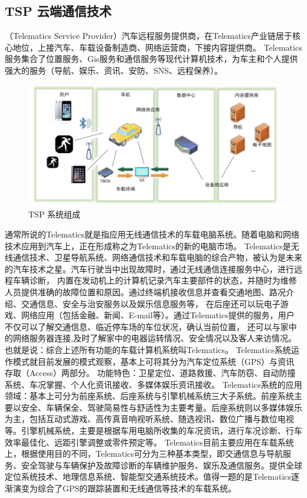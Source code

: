 \subsection{TSP 云端通信技术}

（Telematics Service Provider）汽车远程服务提供商，在Telematics产业链居于核心地位，上接汽车、车载设备制造商、网络运营商，下接内容提供商。
 Telematics服务集合了位置服务、Gis服务和通信服务等现代计算机技术，为车主和个人提供强大的服务（导航、娱乐、资讯、安防、SNS、远程保养）。
 \begin{figure}
    \centering
    \includegraphics[scale=0.6]{resources/img/i2.png}
    \caption{TSP 系统组成}
  \end{figure}
\newline
通常所说的Telematics就是指应用无线通信技术的车载电脑系统。随着电脑和网络技术应用到汽车上，正在形成称之为Telematics的新的电脑市场。
Telematics是无线通信技术、卫星导航系统、网络通信技术和车载电脑的综合产物，被认为是未来的汽车技术之星。汽车行驶当中出现故障时，通过无线通信连接服务中心，进行远程车辆诊断，
内置在发动机上的计算机记录汽车主要部件的状态，并随时为维修人员提供准确的故障位置和原因。通过终端机接收信息并查看交通地图、路况介绍、交通信息、安全与治安服务以及娱乐信息服务等，
在后座还可以玩电子游戏、网络应用（包括金融、新闻、E-mail等）。通过Telematics提供的服务，用户不仅可以了解交通信息、临近停车场的车位状况，确认当前位置，
还可以与家中的网络服务器连接,及时了解家中的电器运转情况、安全情况以及客人来访情况。也就是说：综合上述所有功能的车载计算机系统叫Telematics。
Telematics系统运作模式就目前发展的模式观察，基本上可将其分为汽车定位系统（GPS）与资讯存取（Access）两部分。
功能特色：卫星定位、道路救援、汽车防窃、自动防撞系统、车况掌握、个人化资讯接收、多媒体娱乐资讯接收。
\newline
Telematics系统的应用领域：基本上可分为前座系统、后座系统与引擎机械系统三大子系统。前座系统主要以安全、车辆保全、驾驶简易性与舒适性为主要考量。后座系统则以多媒体娱乐为主，包括互动式游戏、高传真音响视听系统、随选视讯、数位广播与数位电视等。引擎机械系统，主要是根据车用电脑所收集的车况资讯，进行车况诊断、行车效率最佳化、远距引擎调整或零件预定等。
\newline
Telematics目前主要应用在车载系统上，根据使用目的不同，Telematics可分为三种基本类型，即交通信息与导航服务、安全驾驶与车辆保护及故障诊断的车辆维护服务、娱乐及通信服务。提供全球定位系统技术、地理信息系统、智能型交通系统技术。值得一题的是Telematics逐渐演变为综合了GPS的跟踪装置和无线通信等技术的车载系统。

